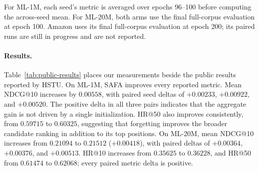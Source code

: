 \documentclass[11pt,letterpaper,logo]{yalearxiv}
\begin{document}
For ML-1M, each seed's metric is averaged over epochs 96--100 before computing
the across-seed mean.  For ML-20M, both arms use the final full-corpus
evaluation at epoch 100.  Amazon uses its final full-corpus evaluation at epoch
200; its paired runs are still in progress and are not reported.

\paragraph{Results.}
Table~\ref{tab:public-results} places our measurements beside the public
results reported by HSTU.  On ML-1M, SAFA improves every reported metric.
Mean NDCG@10 increases by $0.00558$, with
paired seed deltas of $+0.00233$, $+0.00922$, and $+0.00520$.  The positive
delta in all three pairs indicates that the aggregate gain is not driven by a
single initialization.  HR@50 also improves consistently, from $0.59715$ to
$0.60325$, suggesting that forgetting improves the broader candidate ranking
in addition to its top positions.  On ML-20M, mean NDCG@10 increases from
$0.21094$ to $0.21512$ ($+0.00418$), with paired deltas of $+0.00364$,
$+0.00376$, and $+0.00513$.  HR@10 increases from $0.35625$ to $0.36228$, and
HR@50 from $0.61474$ to $0.62068$; every paired metric delta is positive.
\end{document}
